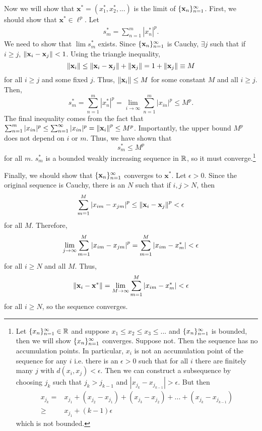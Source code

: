 \begin{example}
  Now we will show that $\mathbf{x}^\ast = (x_{1}^\ast, x_{2}^\ast,
  ... )$ is the limit of $\{{\mathbf{x}}_n \}_{n=1}^\infty$.  First, we should show
  that $\mathbf{x}^\ast \in \ell^p$. Let 
  \begin{align*}
    s_m^\ast = \sum_{n=1}^m |x^\ast_n|^p.
  \end{align*}
  We need to show that $\lim s_m^\ast $ exists.  Since
  $\{{\mathbf{x}}_n \}_{n=1}^\infty$ is Cauchy, $\exists j$ such that if $i \geq j$,
  $\left\Vert {\mathbf{x}_i - \mathbf{x}_j} \right\Vert < 1$. Using the triangle
  inequality, 
  \[ \left\Vert {\mathbf{x}_i} \right\Vert \leq \left\Vert {\mathbf{x}_i - \mathbf{x}_j} \right\Vert +
  \left\Vert {\mathbf{x}_j} \right\Vert = 1 + \left\Vert {\mathbf{x}_j} \right\Vert \equiv M \]
  for all $i \geq j$ and some fixed $j$. Thus, $\left\Vert {\mathbf{x}_i} \right\Vert
  \leq M$ for some constant $M$ and all $i \geq j$. Then, 
  \[
    s_m^\ast = \sum_{n=1}^m |x_{n}^\ast|^p = \lim_{i \to \infty}
    \sum_{n=1}^m |x_{in}|^p\leq M^p.
  \]
  The final inequality comes from the fact that $ \sum_{n=1}^m |x_{in}|^p \leq \sum_{n=1}^\infty
  |x_{in}|^p = \left\Vert {\mathbf{x}_i} \right\Vert^p \leq M^p$. Importantly, the upper
  bound $M^p$ does not depend on $i$ or $m$. Thus, we have shown that
  \[ s_m^\ast \leq M^p \]
  for all $m$. $s_m^\ast$ is a bounded weakly increasing sequence in
  $\mathbb{R}$, so it must converge.\footnote{Let $\{{x}_n \}_{n=1}^\infty \in \mathbb{R}$ and suppose $x_1
    \leq x_2 \leq x_3 \leq ...$ and $\{{x}_n \}_{n=1}^\infty$ is bounded, then we will
    show $\{{x}_n \}_{n=1}^\infty$ converges. Suppose not. Then the sequence has no
    accumulation points. In particular, $x_i$ is not an accumulation
    point of the sequence for any $i$ i.e. there is an $\epsilon>0$
    such that for all $i$ there are finitely many $j$ with $d(x_i,
    x_j) < \epsilon$. Then we can construct a subsequence
    by choosing $j_k$ such that $j_k> j_{k-1}$ and $|x_{j_k} -
    x_{j_{k-1}} | > \epsilon$. But then 
    \begin{align*}
      x_{j_k} = & x_{j_1} + (x_{j_2} - x_{j_1}) + (x_{j_3} - x_{j_2}) +
      ... + (x_{j_k} - x_{j_{k-1}} ) \\
      \geq & x_{j_1} + (k-1) \epsilon 
    \end{align*}
    which is not bounded.}
  
  Finally, we should show that $\{{\mathbf{x}}_n \}_{n=1}^\infty$ converges to
  $\mathbf{x}^\ast$. Let $\epsilon>0$. 
  Since the original sequence is Cauchy, there is an $N$ such that if
  $i,j > N$, then
  \begin{align*}
    \sum_{m=1}^M \left\vert {x_{im} - x_{jm}} \right\vert^p \leq \left\Vert {\mathbf{x}_i -
      \mathbf{x}_j} \right\Vert^p < \epsilon
  \end{align*}
  for all $M$. Therefore, 
  \begin{align*}
    \lim_{j {\rightarrow} \infty} \sum_{m=1}^M \left\vert {x_{im} - x_{jm}} \right\vert^p =
    \sum_{m=1}^M\left\vert {x_{im} - x_m^\ast} \right\vert < \epsilon 
  \end{align*}
  for all $i \geq N$ and all $M$. Thus, 
  \[
  \left\Vert {\mathbf{x}_i - \mathbf{x}^\ast} \right\Vert = \lim_{M {\rightarrow} \infty}
  \sum_{m=1}^M\left\vert {x_{im} - x_m^\ast} \right\vert < \epsilon 
  \]
  for all $i \geq N$, so the sequence converges.
\end{example}

